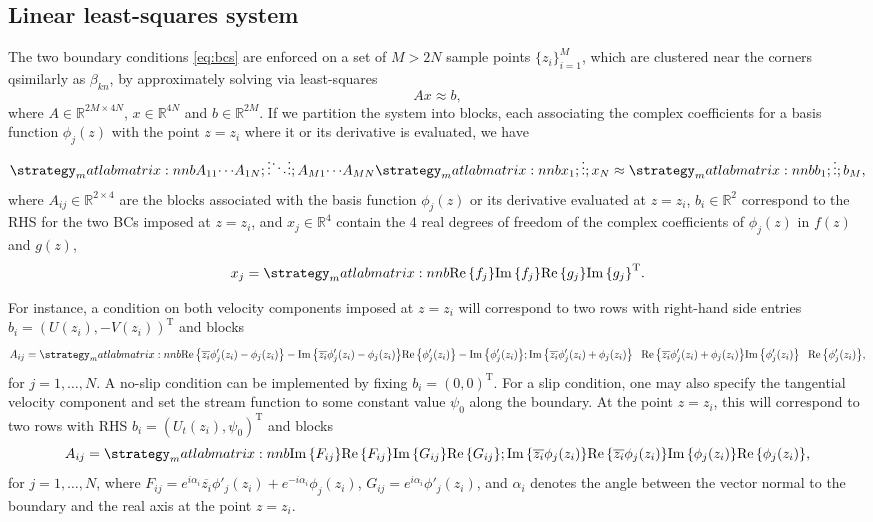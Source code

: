 \documentclass{article}
\newcommand{\reals}{\mathbb{R}}
\newcommand{\transp}{\text{T}}
\newcommand{\conj}[1]{{\overline{#1}}}
\newcommand{\imag}[1]{{\Im\left\{#1\right\}}}
\renewcommand{\real}[1]{{\Re\left\{#1\right\}}}
\begin{document}
\subsection{Linear least-squares system}

The two boundary conditions \eqref{eq:bcs} are enforced on a set of $M > 2N$
sample points $\{z_i \}_{i=1}^M$, which are clustered near the corners
qsimilarly as $\beta_{kn}$, by approximately solving via least-squares
\begin{equation} \label{eq:LS}
A x\approx b,
\end{equation}
where $A\in\reals^{2M\times 4N}$, $x\in\reals^{4N}$ and $b\in\reals^{2M}$. If
we partition the system into blocks, each associating the complex coefficients
for a basis function $\phi_j(z)$ with the point $z=z_i$ where it or its
derivative is evaluated, we have
\begin{equation}
\matlabmatrix{A_{11} {\cdots} A_{1N}; {\vdots} {\ddots} {\vdots}; A_{M1} {\cdots} A_{MN}}
\matlabmatrix{x_{1}; {\vdots}; x_{N}} \approx \matlabmatrix{b_{1}; {\vdots}; b_{M}},
\end{equation}
where $A_{ij}\in\reals^{2\times 4}$ are the blocks associated with the basis
function $\phi_{j}(z)$ or its derivative evaluated at $z=z_i$, $b_i\in\reals^2$
correspond to the RHS for the two BCs imposed at $z=z_i$, and $x_j\in\reals^4$
contain the 4 real degrees of freedom of the complex coefficients of
$\phi_j(z)$ in $f(z)$ and $g(z)$,
\begin{equation}
x_ j = \matlabmatrix{\real{f_j} \imag{f_j} \real{g_j} \imag{g_j}}^\transp.
\end{equation}


For instance, a condition on both velocity components imposed at $z=z_i$ will
correspond to two rows with right-hand side entries $b_i=(U(z_i),
-V(z_i))^\transp$ and blocks
\begin{equation}
\renewcommand*{\arraystretch}{1.5}
A_{ij}= \matlabmatrix{\real{\conj{z_i}\phi'_j(z_i)-\phi_j(z_i)} -\imag{\conj{z_i}\phi'_j(z_i)-\phi_j(z_i)} \real{\phi'_j(z_i)} -\imag{\phi'_j(z_i)}; 
\imag{\conj{z_i}\phi'_j(z_i)+\phi_j(z_i)} \phantom{+}\real{\conj{z_i}\phi'_j(z_i)+\phi_j(z_i)} \imag{\phi'_j(z_i)} \phantom{+}\real{\phi'_j(z_i)}},
\end{equation}
for $j=1,\ldots,N$. A no-slip condition can be implemented by fixing
$b_i=(0,0)^\transp$.  For a slip condition, one may also specify the tangential
velocity component and set the stream function to some constant value $\psi_0$
along the boundary. At the point $z=z_i$, this will correspond to two rows with
RHS $b_i=(U_t(z_i),\psi_0)^\transp$ and blocks
\begin{equation}
\renewcommand*{\arraystretch}{1.5}
A_{ij}=\matlabmatrix{\imag{F_{ij}} \real{F_{ij}} \imag{G_{ij}} \real{G_{ij}}; 
\imag{\conj{z_i}\phi_j(z_i)} \real{\conj{z_i}\phi_j(z_i)} \imag{\phi_j(z_i)} \real{\phi_j(z_i)}},
\end{equation}
for $j=1,\ldots,N$, where
$F_{ij}=e^{i\alpha_i}\conj{z_i}\phi'_j(z_i)+e^{-i\alpha_i}\phi_j(z_i)$,
$G_{ij}=e^{i\alpha_i}\phi'_j(z_i)$, and $\alpha_i$ denotes the angle between
the vector normal to the boundary and the real axis at the point $z=z_i$.
\end{document}

